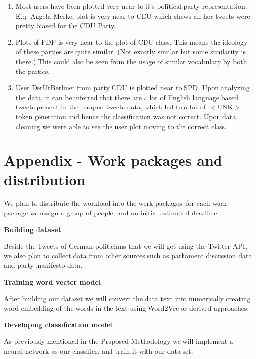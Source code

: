 \documentclass[10pt, oneside]{article}
\begin{document}
\begin{multicols}{2}
\begin{enumerate}
	\item Most users have been plotted very near to it’s political party representation. E.q. Angela Merkel plot is very near to CDU which shows all her tweets were pretty biased for the CDU Party.
	\item Plots of FDP is very near to the plot of CDU class. This means the ideology of these parties are quite similar. (Not exactly similar but some similarity is there.) This could also be seen from the usage of similar vocabulary by both the parties.
	\item User DerUrBerliner from party CDU is plotted near to SPD. Upon analyzing the data, it can be inferred that there are a lot of English language based tweets present in the scraped tweets data, which led to a lot of $<$UNK$>$ token generation and hence the classification was not correct. Upon data cleaning we were able to see the user plot moving to the correct class. 
\end{enumerate}


\end{multicols}
\newpage

\section{Appendix - Work packages and distribution}

We plan to distribute the workload into the work packages, for each work package we assign a group of people, and an initial estimated deadline.

\begin{flushleft}
\textbf{Building dataset}

Beside the Tweets of German politicians that we will get using the Twitter API, we also plan to collect data from other sources such as parliament discussion data and party manifesto data.
\end{flushleft}

\begin{flushleft}
\textbf{Training word vector model}

After building our dataset we will convert the data text into numerically creating word embedding of the words in the text using Word2Vec or derived approaches.
\end{flushleft}

\begin{flushleft}
\textbf{Developing classification model}

As previously mentioned in the Proposed Methodology we will implement a neural network as our classifier, and train it with our data set.
\end{flushleft}
\end{document}
